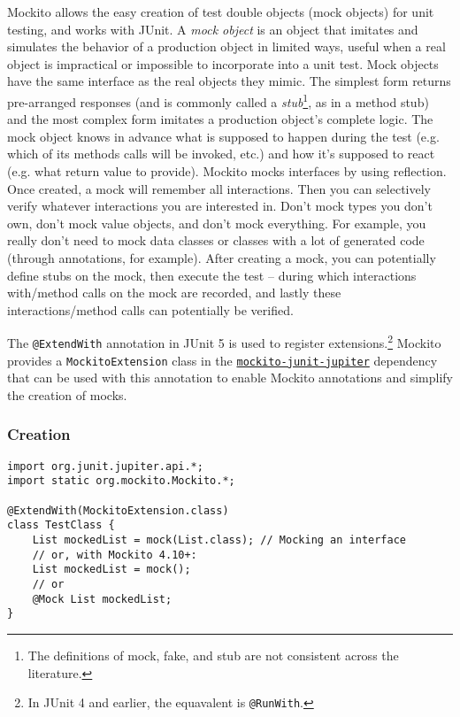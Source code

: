 \documentclass[8pt, table, xcdraw]{article}%
\begin{document}
Mockito allows the easy creation of test double objects (mock objects) for unit testing, and works with JUnit. A \emph{mock object} is an object that imitates and simulates the behavior of a production object in limited ways, useful when a real object is impractical or impossible to incorporate into a unit test. Mock objects have the same interface as the real objects they mimic. The simplest form returns pre-arranged responses (and is commonly called a \emph{stub}\footnote{The definitions of mock, fake, and stub are not consistent across the literature.}, as in a method stub) and the most complex form imitates a production object's complete logic. The mock object knows in advance what is supposed to happen during the test (e.g. which of its methods calls will be invoked, etc.) and how it's supposed to react (e.g. what return value to provide). Mockito mocks interfaces by using reflection. Once created, a mock will remember all interactions. Then you can selectively verify whatever interactions you are interested in. Don't mock types you don’t own, don’t mock value objects, and don’t mock everything. For example, you really don't need to mock data classes or classes with a lot of generated code (through annotations, for example). After creating a mock, you can potentially define stubs on the mock, then execute the test -- during which interactions with/method calls on the mock are recorded, and lastly these interactions/method calls can potentially be verified.

The \lstinline{@ExtendWith} annotation in JUnit 5 is used to register extensions.\footnote{In JUnit 4 and earlier, the equavalent is \lstinline{@RunWith}.} Mockito provides a \lstinline{MockitoExtension} class in the \href{https://mvnrepository.com/artifact/org.mockito/mockito-junit-jupiter}{\lstinline{mockito-junit-jupiter}} dependency that can be used with this annotation to enable Mockito annotations and simplify the creation of mocks.

\subsubsection{Creation}

\begin{lstlisting}
import org.junit.jupiter.api.*;
import static org.mockito.Mockito.*;

@ExtendWith(MockitoExtension.class)
class TestClass {
    List mockedList = mock(List.class); // Mocking an interface
    // or, with Mockito 4.10+:
    List mockedList = mock();
    // or
    @Mock List mockedList;
}
\end{lstlisting}
\end{document}
